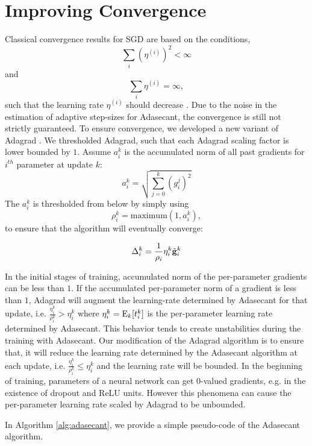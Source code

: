 \documentclass{article}
\begin{document}
\section{Improving Convergence}
Classical convergence results for SGD are based on the conditions,
\[
  \sum_i (\eta^{(i)})^2 < \infty
\]
and 
\[
  \sum_i \eta^{(i)} = \infty,
\]
such that the learning rate $\eta^{(i)}$ should decrease \citep{robbins1951stochastic}. Due to the noise in the estimation of
adaptive step-sizes for Adasecant, the convergence is still not strictly guaranteed. To ensure convergence, 
we developed a new variant of Adagrad \citep{duchi2011adaptive}. We thresholded Adagrad, such that each Adagrad scaling factor 
is lower bounded by $1$. Assume  $a_i^k$ is the accumulated norm of all past gradients for $i^{th}$ parameter at update $k$:
\begin{equation}
a_i^k = \sqrt{\sum_{j=0}^k (g_i^j)^2}
\end{equation}
The $a_i^k$ is thresholded from below by simply using 
\begin{equation}
\rho_i^k = \text{maximum}(1, a_i^k), 
\end{equation}
to ensure that the algorithm
will eventually converge:

\begin{equation}
 \Delta_i^k = \frac{1}{\rho_i}\eta_i^k\tilde{\mathbf{g}}_i^k
\end{equation}

In the initial stages of training, accumulated norm of the per-parameter gradients can be less than $1$. If the
accumulated per-parameter norm of a gradient is less than $1$, Adagrad will augment 
the learning-rate determined by Adasecant for that update, i.e.
$\frac{\eta_i^k}{\rho_i^k} > \eta_i^k$ where $\eta_i^k=\mathrm{E}_k[t_i^k]$ is the per-parameter learning rate determined
by Adasecant. This behavior tends to create unstabilities during the training
with Adasecant. Our modification of the Adagrad algorithm is to ensure that, it will
 reduce the learning rate determined by the Adasecant algorithm at each update, i.e. $\frac{\eta_i^k}{\rho_i^k} \le
 \eta_i^k$ and the learning rate will be bounded. In the beginning of training, parameters of a
 neural network can get $0$-valued gradients, e.g. in the existence of dropout and ReLU units. 
 However this phenomena can cause the per-parameter learning rate scaled by Adagrad to be
 unbounded. 

In Algorithm \ref{alg:adasecant}, we provide a simple pseudo-code of the Adasecant algorithm.
\end{document}
